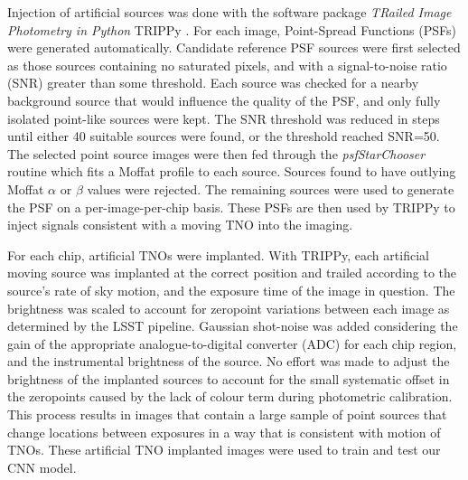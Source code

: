 \documentclass{aastex631}
\begin{document}
Injection of artificial sources was done with the software package \emph{TRailed Image Photometry in Python} TRIPPy \citep{2016AJ....151..158F}. 
For each image, Point-Spread Functions (PSFs) were generated automatically. 
Candidate reference PSF sources were first selected as those sources containing no saturated pixels, and with a signal-to-noise  ratio (SNR) greater than some threshold. 
Each source was checked for a nearby background source that would influence the quality of the PSF, and only fully isolated point-like sources were kept. 
The SNR threshold was reduced in steps until either 40 suitable sources were found, or the threshold reached SNR=50. 
The selected point source images were then fed through the \emph{psfStarChooser} routine which fits a Moffat profile to each source. 
Sources found to have outlying Moffat $\alpha$ or $\beta$ values were rejected. 
The remaining sources were used to generate the PSF on a per-image-per-chip basis. These PSFs are then used by TRIPPy to inject signals consistent with a moving TNO into the imaging.

For each chip, artificial TNOs were implanted. 
With TRIPPy, each artificial moving source was implanted at the correct position and trailed according to the source's rate of sky motion, and the exposure time of the image in question. 
The brightness was scaled to account for zeropoint variations between each image as determined by the LSST pipeline. 
Gaussian shot-noise was added considering the gain of the appropriate analogue-to-digital converter (ADC) for each chip region, and the instrumental brightness of the source. 
No effort was made to adjust the brightness of the implanted sources to account for the small systematic offset in the zeropoints caused by the lack of colour term during photometric calibration. 
This process results in images that contain a large sample of point sources that change locations between exposures in a way that is consistent with motion of TNOs.
These artificial TNO implanted images were used to train and test our CNN model.
\end{document}
